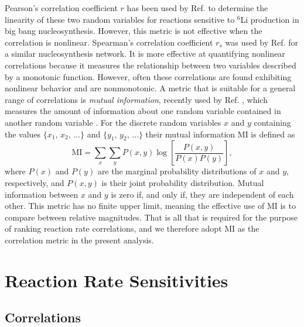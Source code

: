Pearson's correlation coefficient $r$ has been used by Ref. \cite{Coc2014} to determine the linearity of these two random variables for reactions sensitive to $^{6}$Li production in big bang nucleosynthesis. However, this metric is not effective when the correlation is nonlinear. Spearman's correlation coefficient $r_{s}$ was used by Ref. \cite{Iliadis2015b} for a similar nucleosynthesis network. It is more effective at quantifying nonlinear correlations because it measures the relationship between two variables described by a monotonic function. However, often these correlations are found exhibiting nonlinear behavior and are nonmonotonic. A metric that is suitable for a general range of correlations is \emph{mutual information}, recently used by Ref. \cite{Iliadis2020}, which measures the amount of information about one random variable contained in another random variable \cite{Cover2006}. For the discrete random variables $x$ and $y$ containing the values $\{x_{1}, \, x_{2}, \, \ldots\}$ and $\{y_{1}, \, y_{2}, \, \ldots\}$ their mutual information MI is defined as
\begin{equation} \label{eqn:mutual_info}
\mathrm{MI} = \sum_{x} \sum_{y} P(x,y) \log \left[ \frac{P(x,y)}{P(x)P(y)} \right],
\end{equation}
where $P(x)$ and $P(y)$ are the marginal probability distributions of $x$ and $y$, respectively, and $P(x,y)$ is their joint probability distribution. Mutual information between $x$ and $y$ is zero if, and only if, they are independent of each other. This metric has no finite upper limit, meaning the effective use of MI is to compare between relative magnitudes. That is all that is required for the purpose of ranking reaction rate correlations, and we therefore adopt MI as the correlation metric in the present analysis.

\section{Reaction Rate Sensitivities} \label{sec:rate_sensitivities}

\subsection{Correlations}

